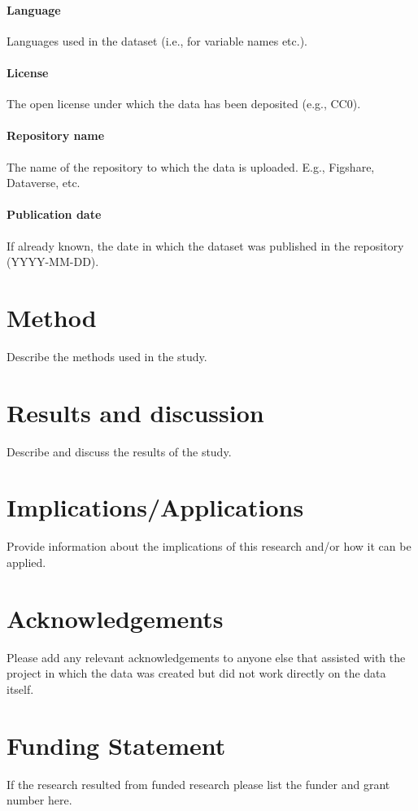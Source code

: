 \documentclass{article}
\begin{document}
\paragraph{Language} Languages used in the dataset (i.e., for variable names etc.).
\paragraph{License} The open license under which the data has been deposited (e.g., CC0). 
\paragraph{Repository name} The name of the repository to which the data is uploaded. E.g., Figshare, Dataverse, etc. 
\paragraph{Publication date} If already known, the date in which the dataset was published in the repository (YYYY-MM-DD).

\section{Method}
Describe the methods used in the study.

\section{Results and discussion}
Describe and discuss the results of the study.

\section{Implications/Applications}
Provide information about the implications of this research and/or how it can be applied.

\section*{Acknowledgements}
Please add any relevant acknowledgements to anyone else that assisted with the project in which the data was created but did not work directly on the data itself.

\section*{Funding Statement}
If the research resulted from funded research please list the funder and grant number here.
\end{document}

